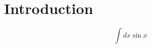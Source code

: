 \chapter{Introduction} 
 \lipsum[1]
 \begin{equation}
 \int dx \sin x
 \end{equation}
 \cite{Grimaldi2014}
 